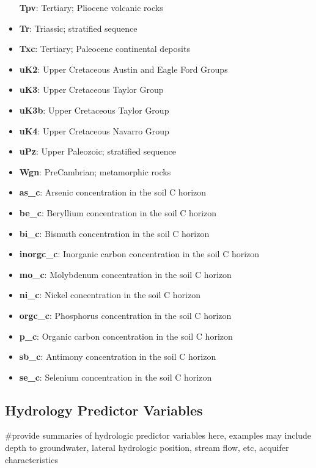 \documentclass[
]{article}
\begin{document}
\begin{itemize}
  \textbf{Tpv}: Tertiary; Pliocene volcanic rocks
\item
  \textbf{Tr}: Triassic; stratified sequence
\item
  \textbf{Txc}: Tertiary; Paleocene continental deposits
\item
  \textbf{uK2}: Upper Cretaceous Austin and Eagle Ford Groups
\item
  \textbf{uK3}: Upper Cretaceous Taylor Group
\item
  \textbf{uK3b}: Upper Cretaceous Taylor Group
\item
  \textbf{uK4}: Upper Cretaceous Navarro Group
\item
  \textbf{uPz}: Upper Paleozoic; stratified sequence
\item
  \textbf{Wgn}: PreCambrian; metamorphic rocks
\item
  \textbf{as\_c}: Arsenic concentration in the soil C horizon
\item
  \textbf{be\_c}: Beryllium concentration in the soil C horizon
\item
  \textbf{bi\_c}: Bismuth concentration in the soil C horizon
\item
  \textbf{inorgc\_c}: Inorganic carbon concentration in the soil C
  horizon
\item
  \textbf{mo\_c}: Molybdenum concentration in the soil C horizon
\item
  \textbf{ni\_c}: Nickel concentration in the soil C horizon
\item
  \textbf{orgc\_c}: Phosphorus concentration in the soil C horizon
\item
  \textbf{p\_c}: Organic carbon concentration in the soil C horizon
\item
  \textbf{sb\_c}: Antimony concentration in the soil C horizon
\item
  \textbf{se\_c}: Selenium concentration in the soil C horizon
\end{itemize}

\hypertarget{hydrology-predictor-variables}{%
\subsection{Hydrology Predictor
Variables}\label{hydrology-predictor-variables}}

\#provide summaries of hydrologic predictor variables here, examples may
include depth to groundwater, lateral hydrologic position, stream flow,
etc, acquifer characteristics
\end{document}
